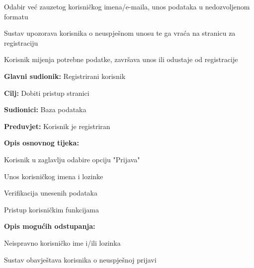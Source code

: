 \begin{packed_item}
\begin{packed_item}
							\item[2.a] Odabir već zauzetog korisničkog imena/e-maila, unos podataka u nedozvoljenom formatu
							
							\item[] \begin{packed_enum}
								
								\item Sustav upozorava korisnika o neuspješnom unosu te ga vraća na stranicu za registraciju
								\item Korisnik mijenja potrebne podatke, završava unos ili odustaje od registracije
								
							\end{packed_enum}
							
						\end{packed_item}
					\end{packed_item}
					
				\noindent {}
					\begin{packed_item}
	
						\item \textbf{Glavni sudionik: } Registrirani korisnik
						\item  \textbf{Cilj:} Dobiti pristup stranici
						\item  \textbf{Sudionici:} Baza podataka
						\item  \textbf{Preduvjet:} Korisnik je registriran
						\item  \textbf{Opis osnovnog tijeka:}
						
						\item[] \begin{packed_enum}
	
	                        \item Korisnik u zaglavlju odabire opciju "Prijava"
							\item Unos korisničkog imena i lozinke
							\item Verifikacija unesenih podataka
							\item Pristup korisničkim funkcijama
							
						\end{packed_enum}
						
						\item  \textbf{Opis mogućih odstupanja:}
						
						\item[] \begin{packed_item}
	
							\item[2.a] Neispravno korisničko ime i/ili lozinka
							\item[] \begin{packed_enum}
								
								\item Sustav obavještava korisnika o neuspješnoj prijavi
								
							\end{packed_enum}
							
						\end{packed_item}
					\end{packed_item}
					
